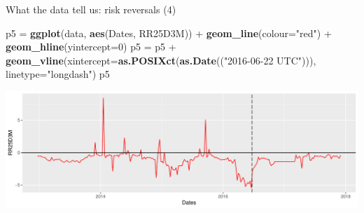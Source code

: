 \documentclass[ignorenonframetext,aspectratio=169]{beamer}
\newenvironment{Shaded}{}{}
\newcommand{\KeywordTok}[1]{\textcolor[rgb]{0.00,0.44,0.13}{\textbf{#1}}}
\newcommand{\DataTypeTok}[1]{\textcolor[rgb]{0.56,0.13,0.00}{#1}}
\newcommand{\DecValTok}[1]{\textcolor[rgb]{0.25,0.63,0.44}{#1}}
\newcommand{\StringTok}[1]{\textcolor[rgb]{0.25,0.44,0.63}{#1}}
\newcommand{\OperatorTok}[1]{\textcolor[rgb]{0.40,0.40,0.40}{#1}}
\newcommand{\NormalTok}[1]{#1}
\begin{document}
\begin{frame}[fragile]{What the data tell us: risk reversals (4)}

\begin{Shaded}
\begin{Highlighting}[]
\NormalTok{p5 =}\StringTok{ }\KeywordTok{ggplot}\NormalTok{(data, }\KeywordTok{aes}\NormalTok{(Dates, RR25D3M)) }\OperatorTok{+}\StringTok{ }\KeywordTok{geom_line}\NormalTok{(}\DataTypeTok{colour=}\StringTok{"red"}\NormalTok{) }\OperatorTok{+}\StringTok{ }
\StringTok{        }\KeywordTok{geom_hline}\NormalTok{(}\DataTypeTok{yintercept=}\DecValTok{0}\NormalTok{)}
\NormalTok{p5 =}\StringTok{ }\NormalTok{p5 }\OperatorTok{+}\StringTok{ }\KeywordTok{geom_vline}\NormalTok{(}\DataTypeTok{xintercept=}\KeywordTok{as.POSIXct}\NormalTok{(}\KeywordTok{as.Date}\NormalTok{((}\StringTok{"2016-06-22 UTC"}\NormalTok{))),}
                     \DataTypeTok{linetype=}\StringTok{"longdash"}\NormalTok{)}
\NormalTok{p5}
\end{Highlighting}
\end{Shaded}

\includegraphics[width=1\linewidth]{2018_02_07_IMF_FXCourse_files/figure-beamer/unnamed-chunk-14-1}

\end{frame}
\end{document}
